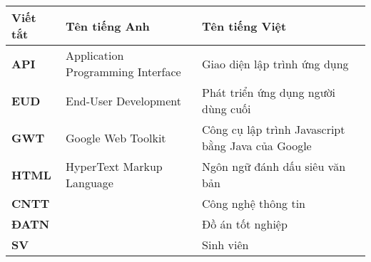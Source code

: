 \documentclass[../DoAn.tex]{subfiles}
\begin{document}
\begin{longtable}{l p{6cm} p{7cm}}
	\hline
   \textbf{Viết tắt}  & \textbf{Tên tiếng Anh}	& \textbf{Tên tiếng Việt} \\ \hline 
	\textbf{API} & Application Programming Interface & Giao diện lập trình ứng dụng\\
	\textbf{EUD} & End-User Development & Phát triển ứng dụng người dùng cuối\\
	\textbf{GWT} & Google Web Toolkit & Công cụ lập trình Javascript bằng Java của Google\\
	\textbf{HTML} & HyperText Markup Language & Ngôn ngữ đánh dấu siêu văn bản\\
	\textbf{CNTT }  &   & Công nghệ thông tin\\
	\textbf{ĐATN} &  & Đồ án tốt nghiệp \\
	\textbf{SV} &  & Sinh viên \\

    \hline
\end{longtable}
\end{document}
